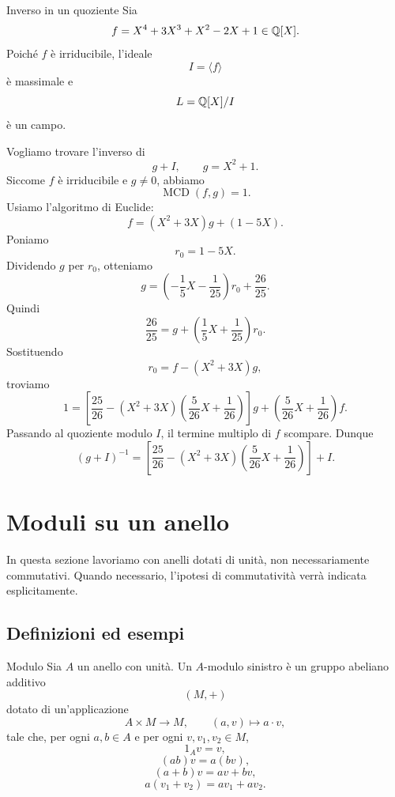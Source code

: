 \documentclass[a4paper]{article}
\begin{document}
\begin{radioactive}
\begin{snippetexample}{Inverso in un quoziente}
    Sia
    \[
        f=X^4+3X^3+X^2-2X+1\in\mathbb{Q}[X].
    \]
    Poiché \(f\) è irriducibile, l'ideale
    \[
        I=\langle f \rangle
    \]
    è massimale e
    \[
        L=\mathbb{Q}[X]/I
    \]
    è un campo.

    Vogliamo trovare l'inverso di
    \[
        g+I,
        \qquad
        g=X^2+1.
    \]
    Siccome \(f\) è irriducibile e \(g\neq 0\), abbiamo
    \[
        \operatorname{MCD}(f,g)=1.
    \]
    Usiamo l'algoritmo di Euclide:
    \[
        f=(X^2+3X)g+(1-5X).
    \]
    Poniamo
    \[
        r_0=1-5X.
    \]
    Dividendo \(g\) per \(r_0\), otteniamo
    \[
        g=
        \left(-\frac{1}{5}X-\frac{1}{25}\right)r_0
        +
        \frac{26}{25}.
    \]
    Quindi
    \[
        \frac{26}{25}
        =
        g+
        \left(\frac{1}{5}X+\frac{1}{25}\right)r_0.
    \]
    Sostituendo
    \[
        r_0=f-(X^2+3X)g,
    \]
    troviamo
    \[
        1
        =
        \left[
            \frac{25}{26}
            -
            (X^2+3X)\left(\frac{5}{26}X+\frac{1}{26}\right)
        \right]g
        +
        \left(\frac{5}{26}X+\frac{1}{26}\right)f.
    \]
    Passando al quoziente modulo \(I\), il termine multiplo di \(f\) scompare. Dunque
    \[
        (g+I)^{-1}
        =
        \left[
            \frac{25}{26}
            -
            (X^2+3X)\left(\frac{5}{26}X+\frac{1}{26}\right)
        \right]+I.
    \]
\end{snippetexample}
\end{radioactive}

\section{Moduli su un anello}

\begin{radioactive}
In questa sezione lavoriamo con anelli dotati di unità, non necessariamente commutativi.
Quando necessario, l'ipotesi di commutatività verrà indicata esplicitamente.
\end{radioactive}

\subsection{Definizioni ed esempi}

\begin{radioactive}
\begin{snippetdefinition}{Modulo}
    Sia \(A\) un anello con unità. Un \(A\)-modulo sinistro è un gruppo abeliano additivo
    \[
        (M,+)
    \]
    dotato di un'applicazione
    \[
        A\times M\to M,
        \qquad
        (a,v)\mapsto a\cdot v,
    \]
    tale che, per ogni \(a,b\in A\) e per ogni \(v,v_1,v_2\in M\),
    \[
        1_Av=v,
    \]
    \[
        (ab)v=a(bv),
    \]
    \[
        (a+b)v=av+bv,
    \]
    \[
        a(v_1+v_2)=av_1+av_2.
    \]
\end{snippetdefinition}
\end{radioactive}
\end{document}
